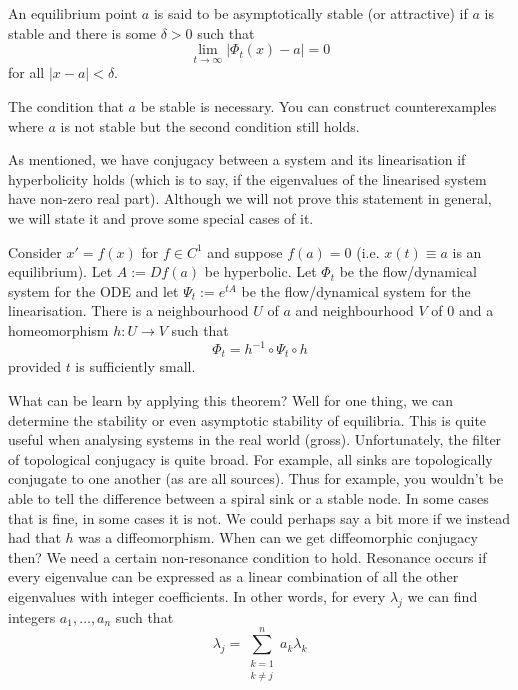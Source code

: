\begin{definition}
An equilibrium point $a$ is said to be asymptotically stable (or attractive) if $a$ is stable and there is some $\delta > 0$ such that $$\lim_{t \to \infty} \left| \Phi_t(x) - a \right| = 0$$
for all $\left| x - a \right| < \delta$.
\end{definition}
\begin{remark}
    The condition that $a$ be stable is necessary. You can construct counterexamples where $a$ is not stable but the second condition still holds.
\end{remark}


As mentioned, we have conjugacy between a system and its linearisation if hyperbolicity holds (which is to say, if the eigenvalues of the linearised system have non-zero real part). Although we will not prove this statement in general, we will state it and prove some special cases of it.

\begin{theorem}
Consider $x' = f(x)$ for $f \in C^1$ and suppose $f(a) = 0$ (i.e. $x(t) \equiv a$ is an equilibrium). Let $A := Df(a)$ be hyperbolic. Let $\Phi_t$ be the flow/dynamical system for the ODE and let $\Psi_t := e^{tA}$ be the flow/dynamical system for the linearisation. There is a neighbourhood $U$ of $a$ and neighbourhood $V$ of 0 and a homeomorphism $h: U \to V$ such that
$$ \Phi_t = h^{-1} \circ \Psi_t \circ h $$
provided $t$ is sufficiently small.
\end{theorem}
What can be learn by applying this theorem? Well for one thing, we can determine the stability or even asymptotic stability of equilibria. This is quite useful when analysing systems in the real world (gross). Unfortunately, the filter of topological conjugacy is quite broad. For example, all sinks are topologically conjugate to one another (as are all sources). Thus for example, you wouldn't be able to tell the difference between a spiral sink or a stable node. In some cases that is fine, in some cases it is not. We could perhaps say a bit more if we instead had that $h$ was a diffeomorphism. When can we get diffeomorphic conjugacy then? We need a certain non-resonance condition to hold. Resonance occurs if every eigenvalue can be expressed as a linear combination of all the other eigenvalues with integer coefficients. In other words, for every $\lambda_j$ we can find integers $a_1, \dots, a_{n}$ such that 
$$ \lambda_j = \sum^n_{\substack{k = 1 \\ k \neq j}} a_k \lambda_k $$
